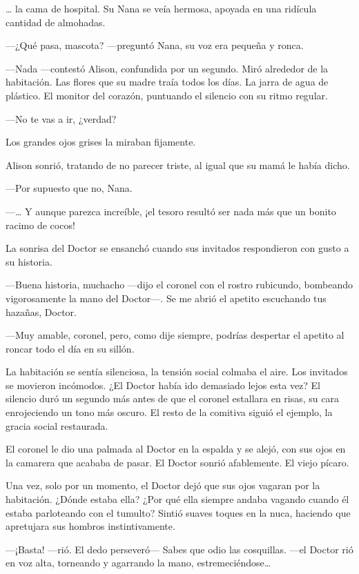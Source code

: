 {\ldots{} la cama de hospital. Su Nana se veía hermosa, apoyada en una
ridícula cantidad de almohadas.}

{---¿Qué pasa, mascota? ---preguntó Nana, su voz era pequeña y ronca.}

{---Nada ---contestó Alison, confundida por un segundo. Miró alrededor de
 la habitación. Las flores que su madre traía todos los días. La jarra de
 agua de plástico. El monitor del corazón, puntuando el silencio con su
ritmo regular.}

{---No te vas a ir, ¿verdad?}

{Los grandes ojos grises la miraban fijamente.}

{Alison sonrió, tratando de no parecer triste, al igual que su mamá le
había dicho.}

{---Por supuesto que no, Nana.}

{---\ldots{} Y aunque
 parezca increíble, ¡el tesoro resultó ser nada más que un bonito racimo
de cocos!}

{La sonrisa del Doctor se ensanchó cuando sus invitados respondieron con
gusto a su historia.}

{---Buena historia, muchacho ---dijo el coronel con el rostro rubicundo,
 bombeando vigorosamente la mano del Doctor---. Se me abrió el apetito
escuchando tus hazañas, Doctor.}

{---Muy amable, coronel, pero, como dije siempre, podrías despertar el
apetito al roncar todo el día en su sillón.}

{La habitación se sentía silenciosa, la tensión social colmaba el aire.
 Los invitados se movieron incómodos. ¿El Doctor había ido demasiado
 lejos esta vez? El silencio duró un segundo más antes de que el coronel
 estallara en risas, su cara enrojeciendo un tono más oscuro. El resto de
la comitiva siguió el ejemplo, la gracia social restaurada.}

{El coronel le dio una palmada al Doctor en la espalda y se alejó, con
 sus ojos en la camarera que acababa de pasar. El Doctor sonrió
afablemente. El viejo pícaro.}

{Una vez, solo por un momento, el Doctor dejó que sus ojos vagaran por la
 habitación. ¿Dónde estaba ella? ¿Por qué ella siempre andaba vagando
 cuando él estaba parloteando con el tumulto? Sintió suaves toques en la
nuca, haciendo que apretujara sus hombros instintivamente.}

{---¡Basta! ---rió. El dedo perseveró--- Sabes que odio las cosquillas.
 ---el Doctor rió en voz alta, torneando y agarrando la mano,
 estremeciéndose\ldots{}}

